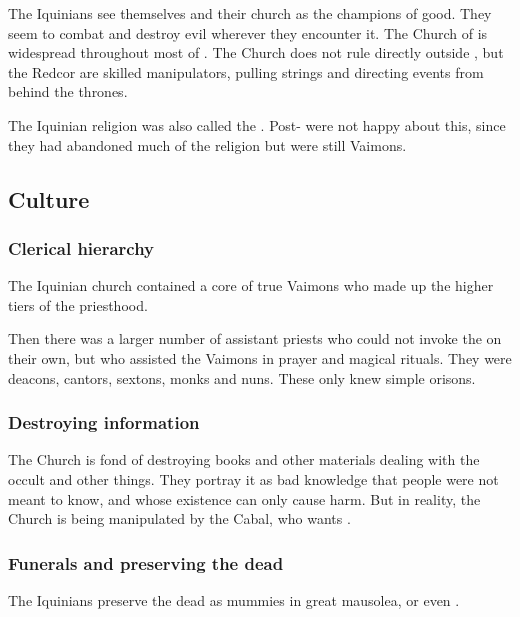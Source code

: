 The Iquinians see themselves and their church as the champions of good. 
They seem to combat and destroy evil wherever they encounter it. 
The Church of \Iquin is widespread throughout most of \Velcad{}. 
The Church does not rule directly outside \Redce{}, but the Redcor are skilled manipulators, pulling strings and directing events from behind the thrones. 

The Iquinian religion was also called the .
Post-\caliphate {} were not happy about this, since they had abandoned much of the religion but were still Vaimons.







\subsection{Culture}





\subsubsection{Clerical hierarchy}
The Iquinian church contained a core of true Vaimons who made up the higher tiers of the priesthood.

Then there was a larger number of assistant priests who could not invoke the \sephiroth on their own, but who assisted the Vaimons in prayer and magical rituals.
They were deacons, cantors, sextons, monks and nuns. 
These only knew simple orisons.





\subsubsection{Destroying information}
The Church is fond of destroying books and other materials dealing with the occult and other  things. They portray it as bad knowledge that people were not meant to know, and whose existence can only cause harm. But in reality, the Church is being manipulated by the Cabal, who wants .





\subsubsection{Funerals and preserving the dead}
The Iquinians preserve the dead as mummies in great mausolea, or even . 

